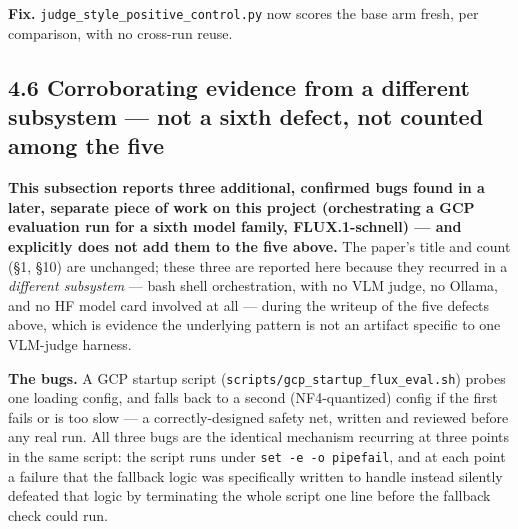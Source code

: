\textbf{Fix.} \texttt{judge\_style\_positive\_control.py} now scores the
base arm fresh, per comparison, with no cross-run reuse.

\hypertarget{corroborating-evidence-from-a-different-subsystem-not-a-sixth-defect-not-counted-among-the-five}{%
\subsection{4.6 Corroborating evidence from a different subsystem ---
not a sixth defect, not counted among the
five}\label{corroborating-evidence-from-a-different-subsystem-not-a-sixth-defect-not-counted-among-the-five}}

\textbf{This subsection reports three additional, confirmed bugs found
in a later, separate piece of work on this project (orchestrating a GCP
evaluation run for a sixth model family, FLUX.1-schnell) --- and
explicitly does not add them to the five above.} The paper's title and
count (§1, §10) are unchanged; these three are reported here because
they recurred in a \emph{different subsystem} --- bash shell
orchestration, with no VLM judge, no Ollama, and no HF model card
involved at all --- during the writeup of the five defects above, which
is evidence the underlying pattern is not an artifact specific to one
VLM-judge harness.

\textbf{The bugs.} A GCP startup script
(\texttt{scripts/gcp\_startup\_flux\_eval.sh}) probes one loading
config, and falls back to a second (NF4-quantized) config if the first
fails or is too slow --- a correctly-designed safety net, written and
reviewed before any real run. All three bugs are the identical mechanism
recurring at three points in the same script: the script runs under
\texttt{set\ -e\ -o\ pipefail}, and at each point a failure that the
fallback logic was specifically written to handle instead silently
defeated that logic by terminating the whole script one line before the
fallback check could run.

